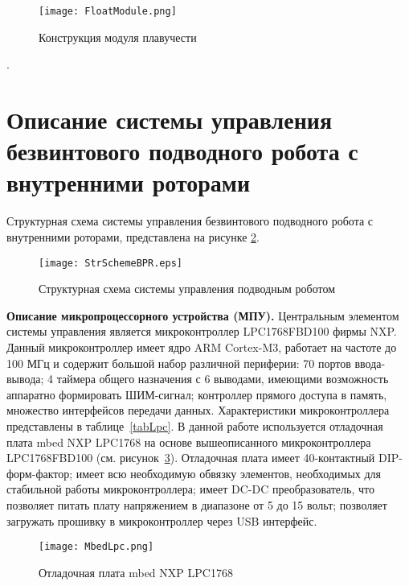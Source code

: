 \begin{figure}[h]
	\centering
	\texttt{[image: FloatModule.png]}%
	\caption{Конструкция модуля плавучести}
	\label{FloatModule}
\end{figure}

.


\section{Описание системы управления безвинтового подводного робота с внутренними роторами}

Структурная схема системы управления безвинтового подводного робота с внутренними роторами, представлена на рисунке \ref{str_scheme}.

\begin{figure}[h!]
	\begin{center}
		\texttt{[image: StrSchemeBPR.eps]}
		\caption{Структурная схема системы управления подводным роботом} \label{str_scheme}
	\end{center}
\end{figure}


\textbf{Описание микропроцессорного устройства (МПУ).} Центральным элементом системы управления является микроконтроллер LPC1768FBD100 фирмы NXP. Данный микроконтроллер имеет ядро ARM Cortex-M3, работает на частоте до 100 МГц и содержит большой набор различной периферии: 70 портов ввода-вывода; 4 таймера общего назначения с 6 выводами, имеющими возможность аппаратно формировать ШИМ-сигнал; контроллер прямого доступа в память, множество интерфейсов передачи данных. Характеристики микроконтроллера представлены в таблице~\ref{tabLpc}. В данной работе используется отладочная плата mbed NXP LPC1768 на основе вышеописанного микроконтроллера LPC1768FBD100 (см. рисунок~\ref{MbedLpc}).  Отладочная плата имеет 40-контактный DIP-форм-фактор; имеет всю необходимую обвязку элементов, необходимых для стабильной работы микроконтроллера; имеет DC-DC преобразователь, что позволяет питать плату напряжением в диапазоне от 5 до 15 вольт; позволяет загружать прошивку в микроконтроллер через USB интерфейс.

\begin{figure}[h]
	\centering
	\texttt{[image: MbedLpc.png]}%
	\caption{Отладочная плата mbed NXP LPC1768}
	\label{MbedLpc}
\end{figure}

